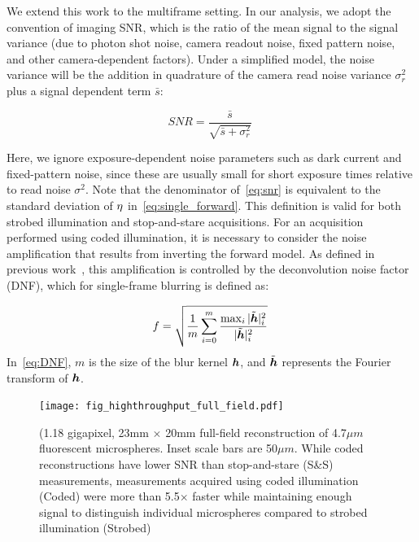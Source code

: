 We extend this work to the multiframe setting.
In our analysis, we adopt the convention of imaging SNR, which is the ratio of the mean signal to the signal variance (due to photon shot noise, camera readout noise, fixed pattern noise, and other camera-dependent factors). Under a simplified model, the noise variance will be the addition in quadrature of the camera read noise variance $\sigma^2_{r}$ plus a signal dependent term $\bar{s}$:

\begin{equation}
    \label{eq:snr}
    SNR = \frac{\bar{s}}{\sqrt{\bar{s} + \sigma^2_{r}}}\;
\end{equation}

Here, we ignore exposure-dependent noise parameters such as dark current and fixed-pattern noise, since these are usually small for short exposure times relative to read noise $\sigma^2$. Note that the denominator of~\eqref{eq:snr} is equivalent to the standard deviation of ${\eta}$ in~\eqref{eq:single_forward}. This definition is valid for both strobed illumination and stop-and-stare acquisitions. For an acquisition performed using coded illumination, it is necessary to consider the noise amplification that results from inverting the forward model. As defined in previous work~\cite{agrawal2009optimal}, this amplification is controlled by the deconvolution noise factor (DNF), which for single-frame blurring is defined as:

\begin{equation} \label{eq:DNF}
f = \sqrt{\frac{1}{m} \sum_{i=0}^m \frac{\max_i{|\tilde{\bm{h}}|_i^2}}{|\tilde{\bm{h}}|_i^2}}\:
\end{equation}
In~\eqref{eq:DNF}, $m$ is the size of the blur kernel $\bm{h}$, and $\tilde{\bm{h}}$ represents the Fourier transform of $\bm{h}$. %


\begin{figure}
  \centering
    \texttt{[image: fig\_highthroughput\_full\_field.pdf]}

  \caption{(1.18 gigapixel, 23mm $\times$ 20mm full-field reconstruction of 4.7$\mu m$ fluorescent microspheres. Inset scale bars are 50$\mu m$. While coded reconstructions have lower SNR than stop-and-stare (S\&S) measurements, measurements acquired using coded illumination (Coded) were more than 5.5$\times$ faster while maintaining enough signal to distinguish individual microspheres compared to strobed illumination (Strobed)}

\end{figure}

